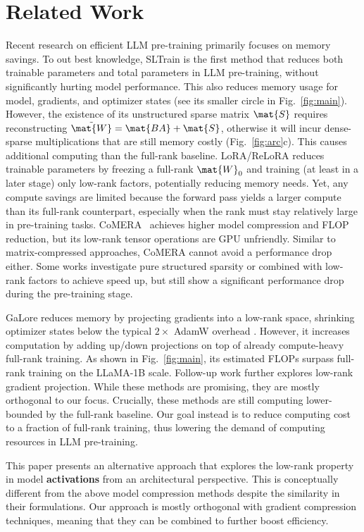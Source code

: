 \section{Related Work}
 Recent research on efficient LLM pre-training primarily focuses on memory savings. To out best knowledge, SLTrain \cite{han2024sltrain} is the first method that reduces both trainable parameters and total parameters in LLM pre-training, without significantly hurting model performance. This also reduces memory usage for model, gradients, and optimizer states (see its smaller circle in Fig.~\ref{fig:main}). However, the existence of its unstructured sparse matrix $\mat{S}$ requires reconstructing $\tilde{\mat{W}} = \mat{BA} + \mat{S}$, otherwise it will incur dense-sparse multiplications that are still memory costly (Fig.~\ref{fig:arc}c). This causes additional computing than the full-rank baseline. LoRA/ReLoRA \cite{hu2021lora, lialin2023relora} reduces trainable parameters by freezing a full-rank $\mat{W}_0$ and training (at least in a later stage) only low-rank factors, potentially reducing memory needs. Yet, any compute savings are limited because the forward pass yields a larger compute than its full-rank counterpart, especially when the rank must stay relatively large in pre-training tasks. CoMERA~\cite{yang2024comera} achieves higher model compression and FLOP reduction, but its low-rank tensor operations are GPU unfriendly. Similar to matrix-compressed approaches, CoMERA cannot avoid a performance drop either. Some works investigate pure structured sparsity or combined with low-rank factors \cite{hu2024accelerating, mozaffari2024slope} to achieve speed up, but still show a significant performance drop during the pre-training stage.

\vspace{5pt}
 GaLore \cite{zhao2024galore} reduces memory by projecting gradients into a low-rank space, shrinking optimizer states below the typical $2\times$ AdamW overhead \cite{loshchilov2017decoupled}. However, it increases computation by adding up/down projections on top of already compute-heavy full-rank training. As shown in Fig.~\ref{fig:main}, its estimated FLOPs surpass full-rank training on the LLaMA-1B scale. Follow-up work \cite{chen2024fira, huang2024galore, liao2024galore, hao2024flora, zhu2024apollo} further explores low-rank gradient projection. While these methods are promising, they are mostly orthogonal to our focus. Crucially, these methods are still computing lower-bounded by the full-rank baseline. Our goal instead is to reduce computing cost to a fraction of full-rank training, thus lowering the demand of computing resources in LLM pre-training.
 




This paper presents an alternative approach that explores the low-rank property in model {\bf activations} from an architectural perspective. This is conceptually different from the above model compression methods despite the similarity in their formulations. Our approach is mostly orthogonal with gradient compression techniques, meaning that they can be combined to further boost efficiency.